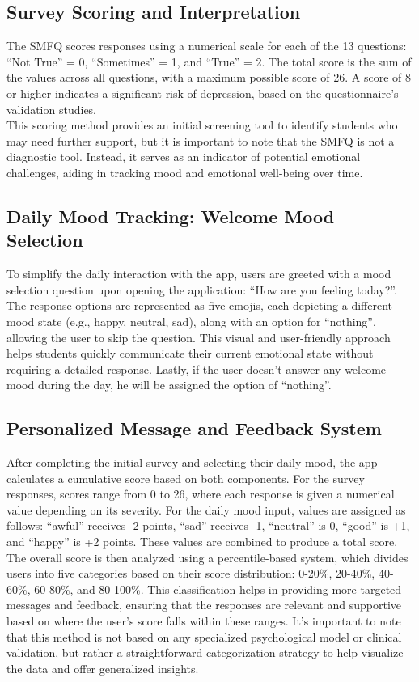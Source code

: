\subsection{Survey Scoring and Interpretation}
The SMFQ scores responses using a numerical scale for each of the 13 questions: ``Not True'' = 0, ``Sometimes'' = 1, and ``True'' = 2. The total score is the sum of the values across all questions, with a maximum possible score of 26. A score of 8 or higher indicates a significant risk of depression, based on the questionnaire’s validation studies.\vspace{5mm} \\
This scoring method provides an initial screening tool to identify students who may need further support, but it is important to note that the SMFQ is not a diagnostic tool. Instead, it serves as an indicator of potential emotional challenges, aiding in tracking mood and emotional well-being over time.

\subsection{Daily Mood Tracking: Welcome Mood Selection}
To simplify the daily interaction with the app, users are greeted with a mood selection question upon opening the application: ``How are you feeling today?''. The response options are represented as five emojis, each depicting a different mood state (e.g., happy, neutral, sad), along with an option for ``nothing'', allowing the user to skip the question. This visual and user-friendly approach helps students quickly communicate their current emotional state without requiring a detailed response. Lastly, if the user doesn't answer any welcome mood during the day, he will be assigned the option of ``nothing''.

\subsection{Personalized Message and Feedback System}
After completing the initial survey and selecting their daily mood, the app calculates a cumulative score based on both components. For the survey responses, scores range from 0 to 26, where each response is given a numerical value depending on its severity. For the daily mood input, values are assigned as follows: ``awful'' receives -2 points, ``sad'' receives -1, ``neutral'' is 0, ``good'' is +1, and ``happy'' is +2 points. These values are combined to produce a total score.\vspace{5mm} \\
The overall score is then analyzed using a percentile-based system, which divides users into five categories based on their score distribution: 0-20\%, 20-40\%, 40-60\%, 60-80\%, and 80-100\%. This classification helps in providing more targeted messages and feedback, ensuring that the responses are relevant and supportive based on where the user’s score falls within these ranges. It’s important to note that this method is not based on any specialized psychological model or clinical validation, but rather a straightforward categorization strategy to help visualize the data and offer generalized insights.

